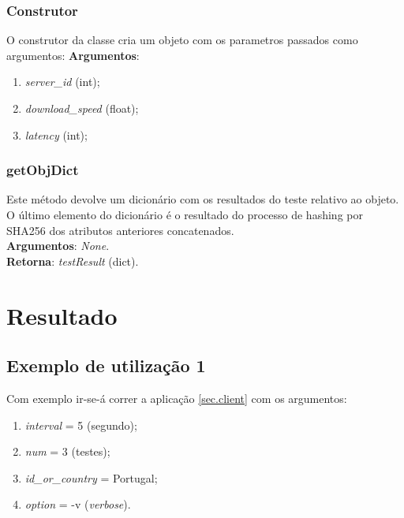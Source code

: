 \documentclass{report}
\begin{document}
\subsection{Construtor}
O construtor da classe cria um objeto com os parametros passados como argumentos:
\textbf{Argumentos}:
\begin{enumerate}
\item \textit{server\_id} (int);
\item \textit{download\_speed} (float);
\item \textit{latency} (int);
\end{enumerate}

\subsection{getObjDict}
Este método devolve um dicionário com os resultados do teste relativo ao objeto. O último elemento do dicionário é o resultado do processo de hashing por SHA256 dos atributos anteriores concatenados.\\
\textbf{Argumentos}: \textit{None}.\\
\textbf{Retorna}: \textit{testResult} (dict).
\chapter{Resultado}
\label{chap:resultados}
\section{Exemplo de utilização 1}
\label{sec:example1}
Com exemplo ir-se-á correr a aplicação \autoref{sec.client} com os argumentos:
\begin{enumerate}
\item \textit{interval} = 5 (segundo);
\item \textit{num} = 3 (testes);
\item \textit{id\_or\_country} = Portugal;
\item \textit{option} = -v (\textit{verbose}).
\end{enumerate}
\end{document}
